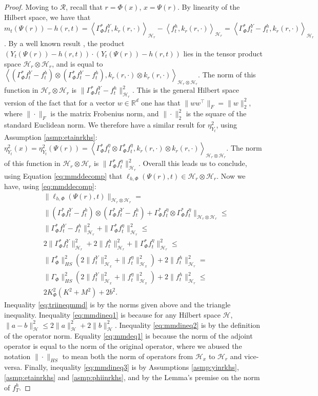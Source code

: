 \documentclass{article}
\def\cH{\mathcal H}
\def\cR{\mathcal{R}}
\def \R{\mathbb{R}}
\newcommand{\lythr}{\ell_{h,\Phi}(\Psi(r),t)}
\newcommand{\GP}{\Gamma_\Phi}
\begin{document}
\begin{proof}
Moving to $\cR$, recall that $r=\Phi(x)$, $x = \Psi(r)$.
By linearity of the Hilbert space, we have that $m_t(\Psi(r)) - h(r,t) = \left<\GP^* f^Y_t, k_r(r,\cdot)\right>_{\cH_r} - \left<f^h_t,k_r(r,\cdot)\right>_{\cH_r} = \left<\GP^* f^Y_t - f^h_t,k_r(r,\cdot)\right>_{\cH_r}$.
By a well known result \citep[Theorem 7.25]{steinwart2008support}, the product $(Y_t(\Psi(r)) - h(r,t) ) \cdot (Y_t(\Psi(r)) - h(r,t) )$ lies in the tensor product space  $\cH_r \otimes \cH_r$, and is equal to $\left< (\GP^* f^Y_t - f^h_t) \otimes (\GP^* f^Y_t - f^h_t) , k_r(r,\cdot) \otimes k_r(r,\cdot) \right>_{\cH_r \otimes \cH_r}$. The norm of this function in $\cH_r \otimes \cH_r$ is $\| \GP^* f^Y_t - f^h_t \|^2_{\cH_r}$. This is the general Hilbert space version of the fact that for a vector $w \in \R^d$ one has that $\|w w^\top\|_F = \|w\|_2^2$, where $\|\cdot\|_F$ is the matrix Frobenius norm, and $\| \cdot\|^2_2$ is the square of the standard Euclidean norm.
We therefore have a similar result for $\eta^2_{Y_t}$, using Assumption \ref{asmp:etainrkhs}: $\eta^2_{Y_t}(x) = \eta^2_{Y_t}(\Psi(r)) = \left<\GP^* f^\eta_t \otimes \GP^* f^\eta_t, k_r(r,\cdot) \otimes k_r(r,\cdot) \right>_{\cH_r \otimes \cH_r}$.  
The norm of this function in $\cH_r \otimes \cH_r$ is $\| \GP^* f^\eta_t \|^2_{\cH_r}$. 
Overall this leads us to conclude, using Equation \eqref{eq:mmddecomp} that $\lythr \in  \cH_r \otimes \cH_r$.
Now we have, using \eqref{eq:mmddecomp}:
\begin{align}
&\|\lythr\|_{\cH_r \otimes \cH_r} = \nonumber \\
&\|(\GP^* f^Y_t - f^h_t) \otimes (\GP^* f^Y_t - f^h_t)  + \GP^* f^\eta_t \otimes \GP^* f^\eta_t\|_{\cH_r \otimes \cH_r} \leq \label{eq:triineqmmd} \\
&\| \GP^* f^Y_t - f^h_t \|^2_{\cH_r} + \| \GP^* f^\eta_t \|^2_{\cH_r}  \label{eq:mmdineq1} \leq \\
&2 \|\GP^* f^Y_t\|^2_{\cH_r} + 2\|f^h_t \|^2_{\cH_r}  + \| \GP^* f^\eta_t \|^2_{\cH_r} \label{eq:mmdineq2} \leq \\
&  \|\GP^*\|^2_{HS} \left(2\|f^Y_t\|^2_{\cH_x} + \|f^\eta_t\|^2 _{\cH_x} \right)+ 2\|f^h_t \|^2_{\cH_r} =  \label{eq:mmdeq1}\\
&  \|\GP\|^2_{HS} \left(2\|f^Y_t\|^2_{\cH_x} + \|f^\eta_t\|^2 _{\cH_x} \right)+ 2\|f^h_t \|^2_{\cH_r} \leq \label{eq:mmdineq3}\\
&2 K_\Phi^2 (K^2 + M^2) + 2 b^2. \nonumber
\end{align}
Inequality \eqref{eq:triineqmmd} is by the norms given above and the triangle inequality.
Inequality \eqref{eq:mmdineq1} is because for any Hilbert space $\cH$, $\|a-b\|^2_\cH \leq 2 \|a\|_\cH^2 + 2 \|b\|_\cH^2$. Inequality \eqref{eq:mmdineq2} is by the definition of the operator norm. Equality \eqref{eq:mmdeq1} is because the norm of the adjoint operator is equal to the norm of the original operator, where we abused the notation $\|\cdot \|_{HS}$ to mean both the norm of operators from $\cH_x$ to $\cH_r$ and vice-versa. Finally, inequality \eqref{eq:mmdineq3} is by Assumptions \ref{asmp:yinrkhs}, \ref{asmp:etainrkhs} and \ref{asmp:phiinrkhs}, and by the Lemma's premise on the norm of $f^h_T$.
\end{proof}
\end{document}
